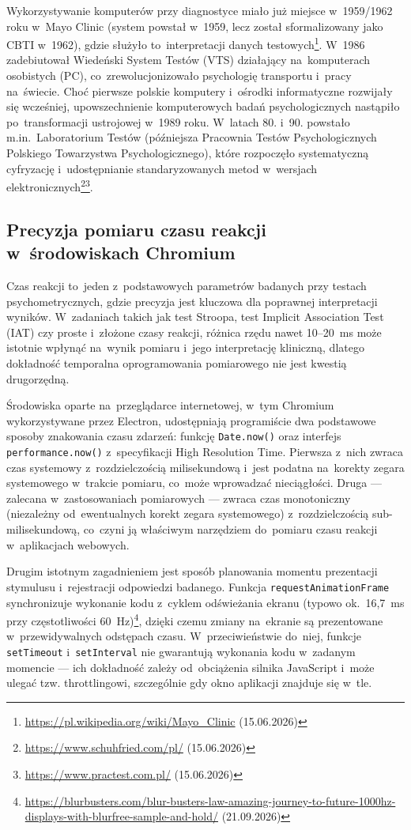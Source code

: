 \documentclass[12pt, a4paper, oneside]{report}
\begin{document}
Wykorzystywanie komputerów przy diagnostyce miało już miejsce w~1959/1962
roku w~Mayo Clinic (system powstał w~1959, lecz został sformalizowany
jako CBTI w~1962), gdzie służyło to~interpretacji danych
testowych\footnote{\url{https://pl.wikipedia.org/wiki/Mayo_Clinic} (15.06.2026)}.
W~1986 zadebiutował Wiedeński System Testów (VTS) działający na~komputerach
osobistych (PC), co~zrewolucjonizowało psychologię transportu i~pracy
na~świecie.
Choć pierwsze polskie komputery i~ośrodki informatyczne rozwijały się
wcześniej, upowszechnienie komputerowych badań psychologicznych
nastąpiło po~transformacji ustrojowej w~1989 roku. W~latach 80. i~90.
powstało m.in.~Laboratorium Testów (późniejsza Pracownia Testów
Psychologicznych Polskiego Towarzystwa Psychologicznego), które
rozpoczęło systematyczną cyfryzację i~udostępnianie standaryzowanych
metod w~wersjach elektronicznych\footnote{\url{https://www.schuhfried.com/pl/} (15.06.2026)}\footnote{\url{https://www.practest.com.pl/} (15.06.2026)}.

\subsection{Precyzja pomiaru czasu reakcji w~środowiskach Chromium}
\label{subsec:precyzja}

Czas reakcji to~jeden z~podstawowych parametrów badanych przy testach
psychometrycznych, gdzie precyzja jest kluczowa dla poprawnej
interpretacji wyników. W~zadaniach takich jak test Stroopa, test
Implicit Association Test (IAT) czy proste i~złożone czasy reakcji,
różnica rzędu nawet 10--20~ms może istotnie wpłynąć na~wynik pomiaru
i~jego interpretację kliniczną, dlatego dokładność temporalna
oprogramowania pomiarowego nie jest kwestią drugorzędną.

Środowiska oparte na~przeglądarce internetowej, w~tym Chromium
wykorzystywane przez Electron, udostępniają programiście dwa
podstawowe sposoby znakowania czasu zdarzeń: funkcję \texttt{Date.now()}
oraz interfejs \texttt{performance.now()} z~specyfikacji High Resolution
Time. Pierwsza z~nich zwraca czas systemowy z~rozdzielczością
milisekundową i~jest podatna na~korekty zegara systemowego
w~trakcie pomiaru, co~może wprowadzać nieciągłości. Druga --- zalecana
w~zastosowaniach pomiarowych --- zwraca czas monotoniczny
(niezależny od~ewentualnych korekt zegara systemowego)
z~rozdzielczością sub-milisekundową, co~czyni ją właściwym narzędziem
do~pomiaru czasu reakcji w~aplikacjach webowych.

Drugim istotnym zagadnieniem jest sposób planowania momentu prezentacji
stymulusu i~rejestracji odpowiedzi badanego. Funkcja
\texttt{requestAnimationFrame} synchronizuje wykonanie kodu z~cyklem
odświeżania ekranu (typowo ok.~16,7~ms przy częstotliwości 60~Hz)\footnote{\raggedright \url{https://blurbusters.com/blur-busters-law-amazing-journey-to-future-1000hz-displays-with-blurfree-sample-and-hold/} (21.09.2026)},
dzięki czemu zmiany na~ekranie są prezentowane w~przewidywalnych
odstępach czasu. W~przeciwieństwie do~niej, funkcje \texttt{setTimeout}
i~\texttt{setInterval} nie gwarantują wykonania kodu w~zadanym momencie
--- ich dokładność zależy od~obciążenia silnika JavaScript i~może
ulegać tzw. throttlingowi, szczególnie gdy okno aplikacji znajduje się
w~tle.
\end{document}
